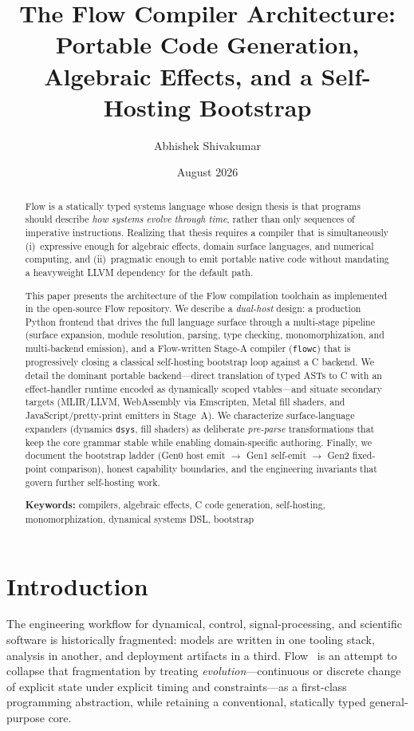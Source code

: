 \documentclass[11pt,a4paper]{article}
\title{The Flow Compiler Architecture:\\
Portable Code Generation, Algebraic Effects, and a Self-Hosting Bootstrap}
\author[1]{Abhishek Shivakumar}
\affil[1]{Independent research \\ \texttt{https://github.com/flooooooooooow/flow}}
\date{August 2026}
\theoremstyle{remark}
\begin{document}
\maketitle

\begin{abstract}
Flow is a statically typed systems language whose design thesis is that programs
should describe \emph{how systems evolve through time}, rather than only
sequences of imperative instructions. Realizing that thesis requires a compiler
that is simultaneously (i)~expressive enough for algebraic effects, domain
surface languages, and numerical computing, and (ii)~pragmatic enough to emit
portable native code without mandating a heavyweight LLVM dependency for the
default path.

This paper presents the architecture of the Flow compilation toolchain as
implemented in the open-source Flow repository. We describe a
\emph{dual-host} design: a production Python frontend that drives the full
language surface through a multi-stage pipeline (surface expansion, module
resolution, parsing, type checking, monomorphization, and multi-backend
emission), and a Flow-written Stage-A compiler (\texttt{flowc}) that is
progressively closing a classical self-hosting bootstrap loop against a C
backend. We detail the dominant portable backend---direct translation of typed
ASTs to C with an effect-handler runtime encoded as dynamically scoped
vtables---and situate secondary targets (MLIR/LLVM, WebAssembly via Emscripten,
Metal fill shaders, and JavaScript/pretty-print emitters in Stage~A). We
characterize surface-language expanders (dynamics \texttt{dsys}, fill shaders)
as deliberate \emph{pre-parse} transformations that keep the core grammar
stable while enabling domain-specific authoring. Finally, we document the
bootstrap ladder (Gen0 host emit $\to$ Gen1 self-emit $\to$ Gen2 fixed-point
comparison), honest capability boundaries, and the engineering invariants that
govern further self-hosting work.

\textbf{Keywords:} compilers, algebraic effects, C code generation,
self-hosting, monomorphization, dynamical systems DSL, bootstrap
\end{abstract}

\section{Introduction}
\label{sec:intro}

The engineering workflow for dynamical, control, signal-processing, and
scientific software is historically fragmented: models are written in one
tooling stack, analysis in another, and deployment artifacts in a third.
Flow~\cite{flow-vision} is an attempt to collapse that fragmentation by treating
\emph{evolution}---continuous or discrete change of explicit state under
explicit timing and constraints---as a first-class programming abstraction,
while retaining a conventional, statically typed general-purpose core.
\end{document}
